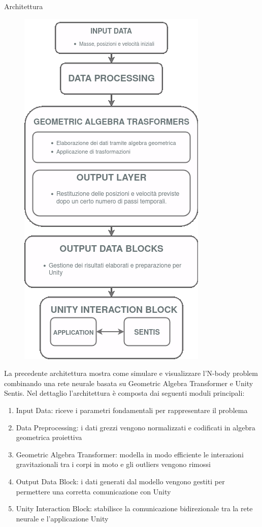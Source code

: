 \begin{frame}{Architettura}
    \begin{figure}[!hb]
        \includegraphics[scale = .325]{../Images/Architecture.png}
    \end{figure}
\end{frame}

\begin{frame}
    La precedente architettura mostra come simulare e visualizzare l'N-body problem combinando una rete neurale basata su Geometric Algebra Transformer e Unity Sentis.
    Nel dettaglio l'architettura è composta dai seguenti moduli principali:
    \begin{enumerate}
        \item Input Data: riceve i parametri fondamentali per rappresentare il problema
        \item Data Preprocessing: i dati grezzi vengono normalizzati e codificati in algebra geometrica proiettiva 
        \item Geometric Algebra Transformer: modella in modo efficiente le interazioni gravitazionali tra i corpi in moto e gli outliers vengono rimossi
        \item Output Data Block: i dati generati dal modello vengono gestiti per permettere una corretta comunicazione con Unity
        \item Unity Interaction Block: stabilisce la comunicazione bidirezionale tra la rete neurale e l'applicazione Unity
    \end{enumerate}
\end{frame}

